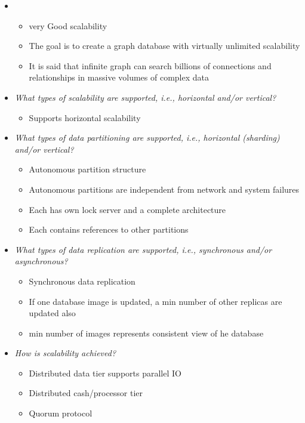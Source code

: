 \begin{itemize}

\item
\begin{itemize}
	\item very Good scalability
	\item The goal is to create a graph database with virtually unlimited scalability
	\item It is said that infinite graph can search billions of connections and relationships in massive volumes of complex data
\end{itemize}

\item \emph{What types of scalability are supported, i.e., horizontal and/or vertical?}
\begin{itemize}
	\item Supports horizontal scalability
\end{itemize}



\item \emph{What types of data partitioning are supported, i.e., horizontal (sharding) and/or vertical?}
\begin{itemize}
	\item Autonomous partition structure
	\item Autonomous partitions are independent from network and system failures
	\item Each has own lock server and a complete architecture
	\item Each contains references to other partitions
\end{itemize}

\item \emph{What types of data replication are supported, i.e., synchronous and/or asynchronous?}
\begin{itemize}
	\item Synchronous data replication
	\item If one database image is updated, a min number of other replicas are updated also
	\item min number of images represents consistent view of he database
\end{itemize}

\item \emph{How is scalability achieved?}
\begin{itemize}
	\item Distributed data tier supports parallel IO
	\item Distributed cash/processor tier
	\item Quorum protocol
\end{itemize}


\end{itemize}
